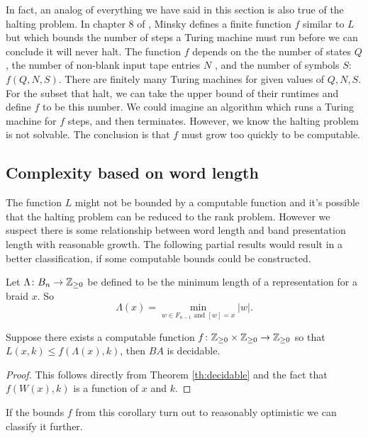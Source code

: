 \documentclass[12pt]{thesis}
\begin{document}
In fact, an analog of everything we have
said in this section is also true of the halting problem.
In chapter 8 of \cite{computation},
Minsky defines a finite function $f$ similar 
to $L$ but which bounds the number of steps a Turing machine must run
before we can conclude it will never halt.
The function $f$ depends on the the number of states $Q$, 
the number of non-blank input tape entries $N$ ,
and the number of symbols $S$: $f(Q, N, S)$.
There are finitely many Turing machines 
for given values of $Q, N, S$. 
For the subset that halt, we can take the upper bound of their
runtimes and define $f$ to be this number.
We could imagine an algorithm which runs a Turing machine for $f$ steps,
and then terminates.
However, we know the halting problem is not solvable.
The conclusion is that $f$ must grow too quickly to be computable.

\subsection{Complexity based on word length}

The function $L$ might not be bounded by a computable function
and it's possible that the halting problem can be reduced to the rank problem.
However we suspect there is some relationship
between word length and band presentation length with reasonable
growth. The following partial results would result
in a better classification, if some computable
bounds could be constructed.

Let $\Lambda \colon B_{n} \rightarrow \mathbb{Z}_{\geq 0}$  be defined
to be the minimum length of a representation for a braid $x$.
So 
\begin{equation}
    \Lambda(x) = \min_{w \in F_{n-1} \text{ and } [w] = x}  |w|.
\end{equation}

\begin{corollary}
    Suppose there exists a computable function $f \colon \mathbb{Z}_{\geq 0} \times \mathbb{Z}_{\geq 0} \rightarrow \mathbb{Z}_{\geq 0}$ so
    that $L(x, k) \leq f(\Lambda(x), k)$,
    then $BA$ is decidable.
\end{corollary}

\begin{proof}
    This follows directly from Theorem \ref{th:decidable} and the fact that $f(W(x), k)$ is a function of $x$ and $k$.
\end{proof}

If the bounds $f$ from this corollary turn out to reasonably optimistic we can classify it further.
\end{document}
